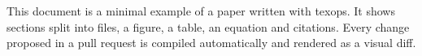 This document is a minimal example of a paper written with texops.
It shows sections split into files, a figure, a table, an equation and citations.
Every change proposed in a pull request is compiled automatically and rendered as a visual diff.

